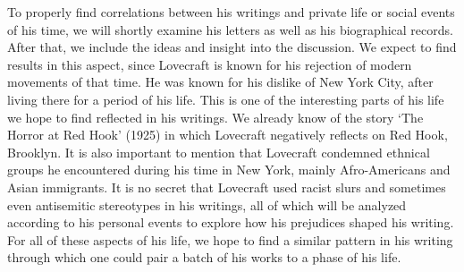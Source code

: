 To properly find correlations between his writings and private life or social events of his 
time, we will shortly examine his letters as well as his biographical records. After that, 
we include the ideas and insight into the discussion. We expect to find results in this aspect, 
since Lovecraft is known for his rejection of modern movements of that time. He was known for 
his dislike of New York City, after living there for a period of his life. This is one of the 
interesting parts of his life we hope to find reflected in his writings. We already know of 
the story ‘The Horror at Red Hook’ (1925) in which Lovecraft negatively reflects on Red Hook, 
Brooklyn. It is also important to mention that Lovecraft condemned ethnical groups he encountered 
during his time in New York, mainly Afro-Americans and Asian immigrants. It is no secret that 
Lovecraft used racist slurs and sometimes even antisemitic stereotypes in his writings, all 
of which will be analyzed according to his personal events to explore how his prejudices shaped 
his writing. For all of these aspects of his life, 
we hope to find a similar pattern in his writing through which one could pair a batch of his 
works to a phase of his life.